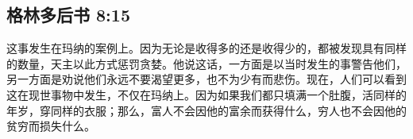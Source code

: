 
\subsection{格林多后书 8:15}

\par

这事发生在玛纳的案例上。因为无论是收得多的还是收得少的，都被发现具有同样的数量，天主以此方式惩罚贪婪。他说这话，一方面是以当时发生的事警告他们，另一方面是劝说他们永远不要渴望更多，也不为少有而悲伤。现在，人们可以看到这在现世事物中发生，不仅在玛纳上。因为如果我们都只填满一个肚腹，活同样的年岁，穿同样的衣服；那么，富人不会因他的富余而获得什么，穷人也不会因他的贫穷而损失什么。\par

